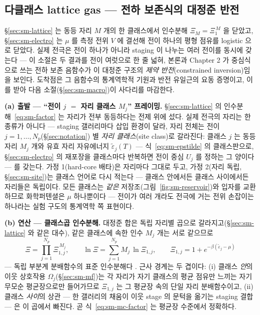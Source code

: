 \subsection{다클래스 lattice gas --- 전하 보존식의 대정준 반전}\label{sec:sm-mc}
\S\ref{sec:sm-lattice} 는 동등 자리 $M$ 개의 한 클래스에서 인수분해 $\Xi_M=\Xi_1^{\,M}$ 을 닫았고,
\S\ref{sec:sm-electro} 는 $\mu$ 를 측정 전위 $V$ 에 결선해 전이 하나의 평형 점유를 logistic 으로 닫았다.
실제 전극은 전이 하나가 아니라 staging 이 나누는 여러 전이를 동시에 갖는다 --- 이 소절은 두 결과를 전이
여럿으로 한 줄 넓혀, 본론과 Chapter 2 가 중심식으로 쓰는 전하 보존 음함수가 이 대정준 구조의
\emph{제약 반전}(constrained inversion)임을 보인다. 도착점은 그 음함수의 통계역학적 기원과 반전 유일근의
요동 증명이고, 이를 받아 다음 소절(\S\ref{sec:sm-macro})이 사다리를 마감한다.

\textbf{(a) 출발 --- ``전이 $j$ $=$ 자리 클래스 $M_j$'' 프레이밍.} \S\ref{sec:sm-lattice} 의
인수분해~\eqref{eq:sm-factor} 는 자리가 전부 동등하다는 전제 위에 섰다. 실제 전극의 자리는 한 종류가 아니다
--- staging 갤러리마다 삽입 환경이 달라, 자리 전체는 전이 $j=1,\dots,N_p$(\S\ref{sec:notation}) 별
\emph{자리 클래스}(site class)로 갈라진다: 클래스 $j$ 는 동등 자리 $M_j$ 개와 유효 자리 자유에너지
$\tilde\varepsilon_j(T)$ --- 식~\eqref{eq:sm-epstilde} 의 클래스판으로, \S\ref{sec:sm-electro} 의 재포장을
클래스마다 반복하면 전이 중심 $U_j$ 를 정하는 그 양이다 --- 를 갖는다. 가정 1(hard-core 배타)은 자리마다
그대로 두고, 가정 2(자리 독립, \S\ref{sec:sm-site})는 클래스 언어로 다시 적는다 --- 클래스 안에서든 클래스
사이에서든 자리들은 독립이다. 모든 클래스는 \emph{같은} 저장조(그림~\ref{fig:sm-reservoir})와 입자를
교환하므로 화학퍼텐셜은 $\mu$ 하나뿐이다 --- 전이가 여러 개라도 전극에 거는 전위 손잡이는 하나라는 실험
구도의 통계역학 쪽 표현이다.

\textbf{(b) 연산 --- 클래스곱 인수분해.} 대정준 합은 독립 자리별 곱으로 갈라지고(\S\ref{sec:sm-lattice} 와
같은 대수), 같은 클래스에 속한 인수 $M_j$ 개는 서로 같으므로
\begin{equation}
\Xi=\prod_{j=1}^{N_p}\Xi_{1,j}^{\,M_j},\qquad
\ln\Xi=\sum_{j=1}^{N_p}M_j\,\ln\Xi_{1,j},\qquad
\Xi_{1,j}=1+e^{-\beta(\tilde\varepsilon_j-\mu)}
\label{eq:sm-mc-factor}
\end{equation}
--- 독립 부분계 분배함수의 표준 인수분해다 \cite{hill1960,mcquarrie1976}. 근사 경계는 두 겹이다: (i) 클래스
\emph{안}의 이웃 상호작용 $\Omega_j$(\S\ref{sec:sm-mf})는 각 자리가 자기 클래스의 평균 점유만 느끼는
자기무모순 평균장으로만 들어가므로 $\Xi_{1,j}$ 는 그 평균장 속의 단일 자리 분배함수이고, (ii) 클래스
\emph{사이}의 상관 --- 한 갤러리의 채움이 이웃 stage 의 문턱을 옮기는 staging 결합 --- 은 이 곱에서 빠진다.
곧 식~\eqref{eq:sm-mc-factor} 는 평균장 수준에서 정확하다.

